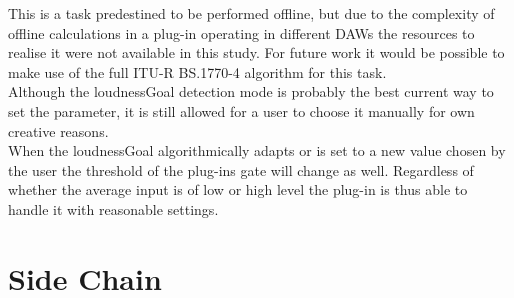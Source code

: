 This is a task predestined to be performed offline, but due to the complexity of offline calculations in a plug-in operating in different DAWs the resources to realise it were not available in this study. For future work it would be possible to make use of the full ITU-R BS.1770-4 algorithm for this task.\\
Although the loudnessGoal detection mode is probably the best current way to set the parameter, it is still allowed for a user to choose it manually for own creative reasons.\\
When the loudnessGoal algorithmically adapts or is set to a new value chosen by the user the threshold of the plug-ins gate will change as well. Regardless of whether the average input is of low or high level the plug-in is thus able to handle it with reasonable settings.\\

\section{Side Chain}

